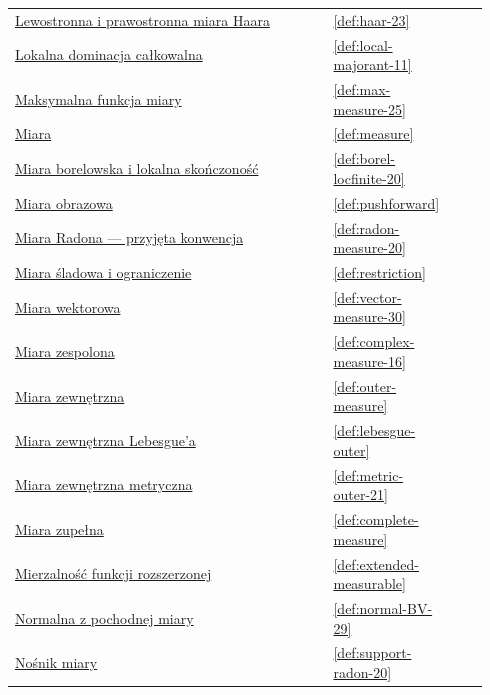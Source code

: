 \documentclass[11pt,a4paper,oneside]{book}
\numberwithin{equation}{chapter}
\theoremstyle{plain}
\theoremstyle{definition}
\theoremstyle{remark}
\begin{document}
\begin{longtable}{@{}p{0.72\linewidth}p{0.135\linewidth}p{0.08\linewidth}@{}}
\hyperref[def:haar-23]{Lewostronna i prawostronna miara Haara} & \ref*{def:haar-23} & \pageref*{def:haar-23} \\
\hyperref[def:local-majorant-11]{Lokalna dominacja całkowalna} & \ref*{def:local-majorant-11} & \pageref*{def:local-majorant-11} \\
\hyperref[def:max-measure-25]{Maksymalna funkcja miary} & \ref*{def:max-measure-25} & \pageref*{def:max-measure-25} \\
\hyperref[def:measure]{Miara} & \ref*{def:measure} & \pageref*{def:measure} \\
\hyperref[def:borel-locfinite-20]{Miara borelowska i lokalna skończoność} & \ref*{def:borel-locfinite-20} & \pageref*{def:borel-locfinite-20} \\
\hyperref[def:pushforward]{Miara obrazowa} & \ref*{def:pushforward} & \pageref*{def:pushforward} \\
\hyperref[def:radon-measure-20]{Miara Radona --- przyjęta konwencja} & \ref*{def:radon-measure-20} & \pageref*{def:radon-measure-20} \\
\hyperref[def:restriction]{Miara śladowa i ograniczenie} & \ref*{def:restriction} & \pageref*{def:restriction} \\
\hyperref[def:vector-measure-30]{Miara wektorowa} & \ref*{def:vector-measure-30} & \pageref*{def:vector-measure-30} \\
\hyperref[def:complex-measure-16]{Miara zespolona} & \ref*{def:complex-measure-16} & \pageref*{def:complex-measure-16} \\
\hyperref[def:outer-measure]{Miara zewnętrzna} & \ref*{def:outer-measure} & \pageref*{def:outer-measure} \\
\hyperref[def:lebesgue-outer]{Miara zewnętrzna Lebesgue'a} & \ref*{def:lebesgue-outer} & \pageref*{def:lebesgue-outer} \\
\hyperref[def:metric-outer-21]{Miara zewnętrzna metryczna} & \ref*{def:metric-outer-21} & \pageref*{def:metric-outer-21} \\
\hyperref[def:complete-measure]{Miara zupełna} & \ref*{def:complete-measure} & \pageref*{def:complete-measure} \\
\hyperref[def:extended-measurable]{Mierzalność funkcji rozszerzonej} & \ref*{def:extended-measurable} & \pageref*{def:extended-measurable} \\
\hyperref[def:normal-BV-29]{Normalna z pochodnej miary} & \ref*{def:normal-BV-29} & \pageref*{def:normal-BV-29} \\
\hyperref[def:support-radon-20]{Nośnik miary} & \ref*{def:support-radon-20} & \pageref*{def:support-radon-20} \\

\end{longtable}
\end{document}
